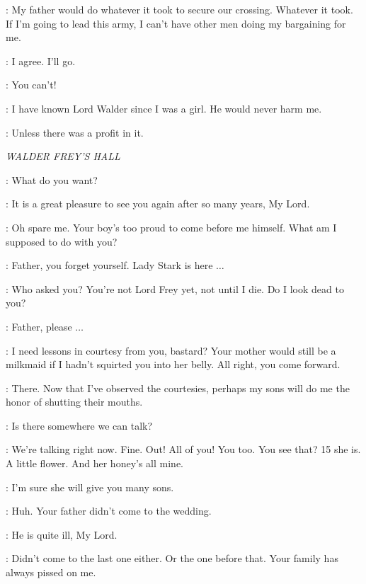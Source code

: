 \ROBB: My father would do whatever it took to secure our crossing. Whatever it took. If I'm going to lead this army, I can't have other men doing my bargaining for me. 

\CATELYN: I agree. I'll go. 

\THEON: You can't! 

\CATELYN: I have known Lord Walder since I was a girl. He would never harm me. 

\UMBER: Unless there was a profit in it. 


\scene

\textit{WALDER FREY'S HALL} 


\FREY: What do you want? 

\CATELYN: It is a great pleasure to see you again after so many years, My Lord. 

\FREY: Oh spare me. Your boy's too proud to come before me himself. What am I supposed to do with you? 

\STEVRONFREY: Father, you forget yourself. Lady Stark is here $\ldots$  

\FREY: Who asked you? You're not Lord Frey yet, not until I die. Do I look dead to you? 

\WALDERRIVERS: Father, please $\ldots$  

\FREY: I need lessons in courtesy from you, bastard? Your mother would still be a milkmaid if I hadn't squirted you into her belly. All right, you come forward. 


\FREY: There. Now that I've observed the courtesies, perhaps my sons will do me the honor of shutting their mouths. 

\CATELYN: Is there somewhere we can talk? 

\FREY: We're talking right now.  Fine. Out! All of you!    You too.  You see that? 15 she is. A little flower. And her honey's all mine. 

\CATELYN: I'm sure she will give you many sons. 

\FREY: Huh. Your father didn't come to the wedding. 

\CATELYN: He is quite ill, My Lord. 

\FREY: Didn't come to the last one either. Or the one before that. Your family has always pissed on me. 

